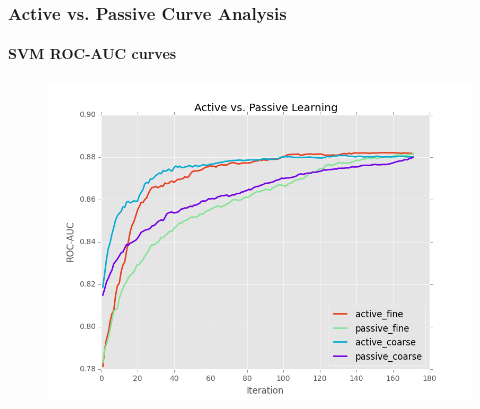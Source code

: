 \documentclass{beamer}
\begin{document}
\begin{frame}
    \frametitle{Active vs. Passive Curve Analysis}  %
    \framesubtitle{SVM ROC-AUC curves}
    \begin{figure}[!htb]
        \centering
        \includegraphics[width=0.80\columnwidth]{fig/runActPassSVM_roc}
        \label{fig:ActiveVsPassiveROCSVM}
    \end{figure}
\end{frame}
\end{document}

